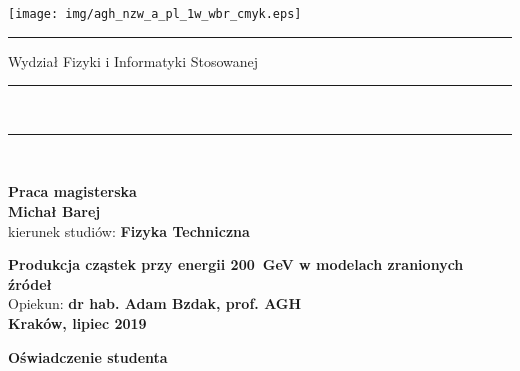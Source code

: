 \documentclass[a4paper,12pt]{article}
\begin{document}

\thispagestyle{empty}
\texttt{[image: img/agh\_nzw\_a\_pl\_1w\_wbr\_cmyk.eps]}\\
\rule{30mm}{0pt}
{\large \textsf{Wydział Fizyki i Informatyki Stosowanej}}\\
\rule{\textwidth}{3pt}\\
\rule[2ex]
{\textwidth}{1pt}\\
\vspace{7ex}
\begin{center}
{\LARGE \bf \textsf{Praca magisterska}}\\
\vspace{13ex}
{\bf \Large \textsf{Michał Barej}}\\
\vspace{3ex}
{\sf\small kierunek studiów:} {\bf\small \textsf{Fizyka Techniczna}}\\
\vspace{1.5ex}

{\bf \huge \textsf{Produkcja cząstek przy energii 200~GeV w modelach zranionych źródeł}}\\
\vspace{14ex}
{\Large Opiekun: \bf \textsf{dr hab. Adam Bzdak, prof. AGH}}\\
\vspace{22ex}
{\large \bf \textsf{Kraków, lipiec 2019}}
\end{center}

\newpage

\begin{center}
        {\bf\large\textsf{Oświadczenie studenta}}
\end{center}
\end{document}
